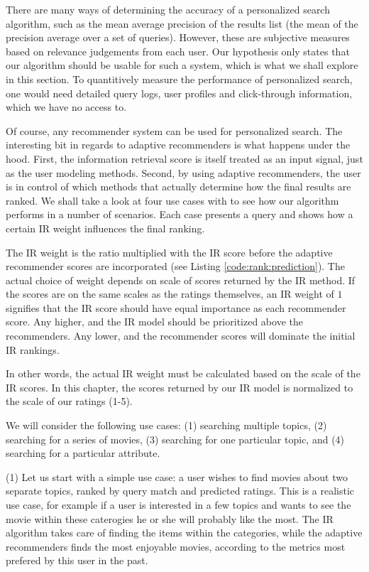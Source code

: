 There are many ways of determining the accuracy of a personalized search
algorithm, such as the mean average precision of the results list
(the mean of the precision average over a set of queries).
However, these are subjective measures based on relevance judgements from each user.
Our hypothesis only states that our algorithm should be usable for such 
a system, which is what we shall explore in this section.
To quantitively measure the performance of personalized search,
one would need detailed query logs, user profiles and click-through information,
which we have no access to.

Of course, any recommender system can be used for personalized search.
The interesting bit in regards to adaptive recommenders is what 
happens under the hood. First, the information retrieval score 
is itself treated as an input signal, just as the user modeling methods.
Second, by using adaptive recommenders, the user is in control of which
methods that actually determine how the final results are ranked.
We shall take a look at four use cases with to see how our algorithm
performs in a number of scenarios. Each case presents 
a query and shows how a certain IR weight influences the final ranking.

The IR weight is the ratio multiplied with the IR score 
before the adaptive recommender scores are incorporated
(see Listing \ref{code:rank:prediction}).
The actual choice of weight depends on scale of scores
returned by the IR method.
If the scores are on the same scales as the ratings themselves,
an IR weight of $1$ signifies that the IR score
should have equal importance as each recommender score.
Any higher, and the IR model should be prioritized above the recommenders.
Any lower, and the recommender scores will dominate the initial IR rankings.

In other words, the actual IR weight must
be calculated based on the scale of the IR scores.
In this chapter, the scores returned by our IR
model is normalized to the scale of our ratings (1-5).

We will consider the following use cases:
(1) searching multiple topics,
(2) searching for a series of movies,
(3) searching for one particular topic, and
(4) searching for a particular attribute.


\afterpage{\clearpage}

(1) Let us start with a simple use case:
a user wishes to find movies about two separate topics, ranked by 
query match and predicted ratings.
This is a realistic use case, for example if a user is interested
in a few topics and wants to see the movie within these caterogies
he or she will probably like the most.
The IR algorithm takes care of finding the items within the categories,
while the adaptive recommenders finds the most enjoyable movies,
according to the metrics most prefered by this user in the past.

